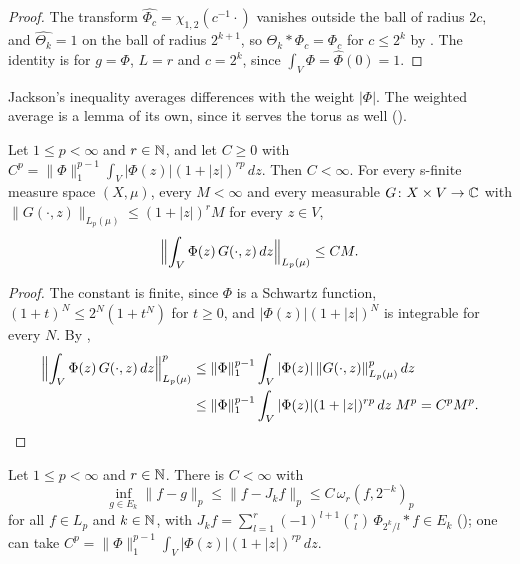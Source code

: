 \begin{proof}
\leanok
The transform $\widehat{\Phi_c} = \chi_{1,2}(c^{-1} \cdot)$ vanishes outside the ball of radius $2c$,
and $\widehat{\Theta_k} = 1$ on the ball of radius $2^{k+1}$, so $\Theta_k * \Phi_c = \Phi_c$ for
$c \leq 2^k$ by . The identity is  for
$g = \Phi$, $L = r$ and $c = 2^k$, since $\int_V \Phi = \widehat{\Phi}(0) = 1$.
\end{proof}

Jackson's inequality averages differences with the weight $|\Phi|$. The weighted average is a
lemma of its own, since it serves the torus as well ().

\begin{lemma}
\label{lem:jackson-weighted-average}
\leanok
{}
Let $1 \leq p < \infty$ and $r \in \mathbb{N}$, and let $C \geq 0$ with
$C^p = \|\Phi\|_1^{p-1} \int_V |\Phi(z)| (1 + |z|)^{rp} \, dz$. Then $C < \infty$. For every
s-finite measure space $(X, \mu)$, every $M < \infty$ and every measurable
$G \colon X \times V \to \mathbb{C}$ with $\|G(\cdot, z)\|_{L_p(\mu)} \leq (1 + |z|)^r M$ for every
$z \in V$,
\[
  \Bigl\|\int_V \Phi(z) \, G(\cdot, z) \, dz\Bigr\|_{L_p(\mu)} \leq C M .
\]
\end{lemma}

\begin{proof}
\leanok
The constant is finite, since $\Phi$ is a Schwartz function,
$(1 + t)^N \leq 2^N (1 + t^N)$ for $t \geq 0$, and $|\Phi(z)| (1 + |z|)^N$ is integrable for every
$N$. By ,
\begin{align*}
  \Bigl\|\int_V \Phi(z) \, G(\cdot, z) \, dz\Bigr\|_{L_p(\mu)}^p
    &\leq \|\Phi\|_1^{p-1} \int_V |\Phi(z)| \, \|G(\cdot, z)\|_{L_p(\mu)}^p \, dz \\
    &\leq \|\Phi\|_1^{p-1} \int_V |\Phi(z)| (1 + |z|)^{rp} \, dz \; M^p = C^p M^p .
\end{align*}
\end{proof}

\begin{theorem}
\label{thm:band-jackson}
\leanok
{}
Let $1 \leq p < \infty$ and $r \in \mathbb{N}$. There is $C < \infty$ with
\[
  \inf_{g \in E_k} \|f - g\|_p \leq \|f - J_k f\|_p \leq C \, \omega_r(f, 2^{-k})_p
\]
for all $f \in L_p$ and $k \in \mathbb{N}$, with
$J_k f = \sum_{l=1}^r (-1)^{l+1} \binom{r}{l} \, \Phi_{2^k/l} * f \in E_k$
(); one can take
$C^p = \|\Phi\|_1^{p-1} \int_V |\Phi(z)| (1 + |z|)^{rp} \, dz$.
\end{theorem}

